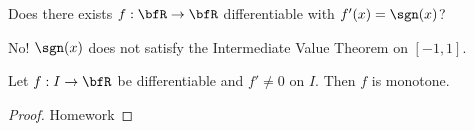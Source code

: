     \begin{question}
        Does there exists $f:\bfR \rightarrow \bfR$ differentiable with $f'(x) = \sgn(x)$?
    \end{question}
        \begin{answer}
            No! $\sgn(x)$ does not satisfy the Intermediate Value Theorem on $[-1,1]$.
        \end{answer}

    \begin{corollary}
        Let $f:I \rightarrow \bfR$ be differentiable and $f' \neq 0$ on $I$. Then $f$ is monotone.
    \end{corollary}
        \begin{proof}
            Homework
        \end{proof}

    